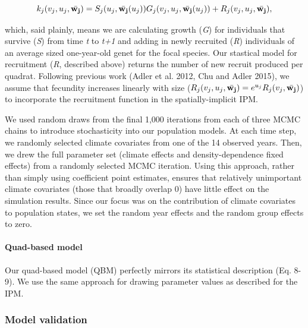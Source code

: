 \documentclass[12pt,]{article}
\begin{document}
\begin{equation}
k_{j}(v_{j},u_{j},\bar{\bold{w_{j}}}) = S_j(u_j, \bar{\bold{w_{j}}}(u_{j}))G_j(v_{j},u_{j},\bar{\bold{w_{j}}}(u_{j})) + R_j(v_{j},u_{j},\bar{\bold{w_{j}}}),
\end{equation}

which, said plainly, means we are calculating growth (\emph{G}) for
individuals that survive (\emph{S}) from time \emph{t} to \emph{t+1} and
adding in newly recruited (\emph{R}) individuals of an average sized
one-year-old genet for the focal species. Our stastical model for
recruitment (\emph{R}, described above) returns the number of new
recruit produced per quadrat. Following previous work (Adler et al.
2012, Chu and Adler 2015), we assume that fecundity increases linearly
with size
($R_j(v_{j},u_{j},\bar{\bold{w_{j}}}) = e^{u_j}R_j(v_{j},\bar{\bold{w_{j}}})$)
to incorporate the recruitment function in the spatially-implicit IPM.

We used random draws from the final 1,000 iterations from each of three
MCMC chains to introduce stochasticity into our population models. At
each time step, we randomly selected climate covariates from one of the
14 observed years. Then, we drew the full parameter set (climate effects
and density-dependence fixed effects) from a randomly selected MCMC
iteration. Using this approach, rather than simply using coefficient
point estimates, ensures that relatively unimportant climate covariates
(those that broadly overlap 0) have little effect on the simulation
results. Since our focus was on the contribution of climate covariates
to population states, we set the random year effects and the random
group effects to zero.

\paragraph{Quad-based model}\label{quad-based-model}

Our quad-based model (QBM) perfectly mirrors its statistical description
(Eq. 8-9). We use the same approach for drawing parameter values as
described for the IPM.

\subsubsection{Model validation}\label{model-validation}
\end{document}
